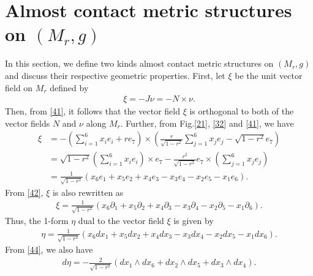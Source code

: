 \documentclass[12pt]{article}
\numberwithin{equation}{section}
\begin{document}
\section{Almost contact metric structures on $(M_r, g)$}\label{sec4}
In this section, we define two kinds almost contact metric
structures on $(M_{r}, g)$ and discuss their respective geometric
properties. \noindent First, let $\xi$ be the unit vector field on
$M_{r}$ defined by
\begin{equation}\label{41}
\begin{split}
\xi = -J\nu = -N\times \nu.
\end{split}
\end{equation}
Then, from \eqref{41}, it follows that the vector field
$\xi$ is orthogonal to both of the vector fields $N$ and $\nu$ along
$M_{r}$. Further, from Fig.\eqref{21}, \eqref{32} and \eqref{41}, we have
\begin{equation}\label{42}
\begin{split}
\xi &= -(\sum_{i=1}^6 x_ie_i+re_7)\times
(\frac{r}{\sqrt{1-r^2}}\sum_{j=1}^6 x_je_j-\sqrt{1-r^2}e_7)\\
&=\sqrt{1-r^2}(\sum_{i=1}^6 x_ie_i)\times e_7-\frac{r^2}{\sqrt{1-r^2}}e_7
\times (\sum_{j=1}^6 x_je_j)\\
&=\frac{1}{\sqrt{1-r^2}}(x_6e_1+x_5e_2+x_4e_3-x_3e_4-x_2e_5-x_1e_6).
\end{split}
\end{equation}
From \eqref{42}, $\xi$ is also rewritten as
\begin{equation}\label{43}
\begin{split}
\xi
=\frac{1}{\sqrt{1-r^2}}(x_6\partial_1+x_5\partial_2+x_4\partial_3-x_3\partial_4-x_2\partial_5-x_1\partial_6).
\end{split}
\end{equation}
Thus, the 1-form $\eta$ dual to the vector field $\xi$ is given by
\begin{equation}\label{44}
\begin{split}
\eta
=\frac{1}{\sqrt{1-r^2}}(x_6dx_1+x_5dx_2+x_4dx_3-x_3dx_4-x_2dx_5-x_1dx_6).
\end{split}
\end{equation}
From \eqref{44}, we also have
\begin{equation}\label{45}
\begin{split}
d\eta =-\frac{2}{\sqrt{1-r^2}}(dx_1\wedge dx_6+dx_2\wedge
dx_5+dx_3\wedge dx_4).
\end{split}
\end{equation}
\end{document}
